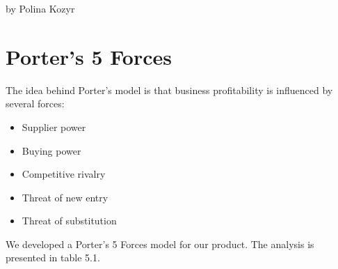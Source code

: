 by Polina Kozyr

\section{Porter's 5 Forces}

The idea behind Porter's model \cite{PorterFiveForces} is that business profitability is influenced by several forces:

\begin{itemize}
\item Supplier power
\item Buying power
\item Competitive rivalry
\item Threat of new entry 
\item Threat of substitution
\end{itemize}
We developed a Porter's 5 Forces model for our product. The analysis is presented in table 5.1.

